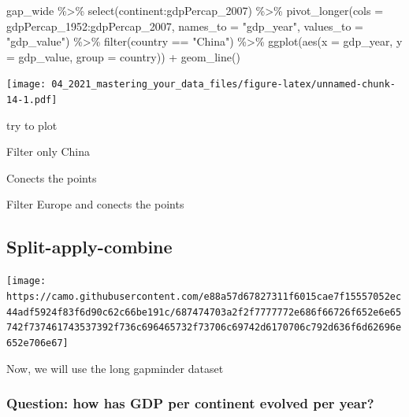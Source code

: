 \documentclass[
]{article}
\newenvironment{Shaded}{\begin{snugshade}}{\end{snugshade}}
\newcommand{\AttributeTok}[1]{\textcolor[rgb]{0.77,0.63,0.00}{#1}}
\newcommand{\FunctionTok}[1]{\textcolor[rgb]{0.00,0.00,0.00}{#1}}
\newcommand{\NormalTok}[1]{#1}
\newcommand{\SpecialCharTok}[1]{\textcolor[rgb]{0.00,0.00,0.00}{#1}}
\newcommand{\StringTok}[1]{\textcolor[rgb]{0.31,0.60,0.02}{#1}}
\begin{document}
\begin{Shaded}
\begin{Highlighting}[]
\NormalTok{gap\_wide }\SpecialCharTok{\%\textgreater{}\%} 
  \FunctionTok{select}\NormalTok{(continent}\SpecialCharTok{:}\NormalTok{gdpPercap\_2007) }\SpecialCharTok{\%\textgreater{}\%} 
  \FunctionTok{pivot\_longer}\NormalTok{(}\AttributeTok{cols =}\NormalTok{ gdpPercap\_1952}\SpecialCharTok{:}\NormalTok{gdpPercap\_2007, }
               \AttributeTok{names\_to =} \StringTok{"gdp\_year"}\NormalTok{, }
               \AttributeTok{values\_to =} \StringTok{"gdp\_value"}\NormalTok{) }\SpecialCharTok{\%\textgreater{}\%} 
  \FunctionTok{filter}\NormalTok{(country }\SpecialCharTok{==} \StringTok{"China"}\NormalTok{) }\SpecialCharTok{\%\textgreater{}\%} 
  \FunctionTok{ggplot}\NormalTok{(}\FunctionTok{aes}\NormalTok{(}\AttributeTok{x =}\NormalTok{ gdp\_year, }
             \AttributeTok{y =}\NormalTok{ gdp\_value, }
             \AttributeTok{group =}\NormalTok{ country)) }\SpecialCharTok{+} 
  \FunctionTok{geom\_line}\NormalTok{()}
\end{Highlighting}
\end{Shaded}

\texttt{[image: 04\_2021\_mastering\_your\_data\_files/figure-latex/unnamed-chunk-14-1.pdf]}

try to plot

Filter only China

Conects the points

Filter Europe and conects the points

\hypertarget{split-apply-combine}{%
\subsection{Split-apply-combine}\label{split-apply-combine}}

\texttt{[image: https://camo.githubusercontent.com/e88a57d67827311f6015cae7f15557052ec44adf5924f83f6d90c62c66be191c/687474703a2f2f7777772e686f66726f652e6e65742f737461743537392f736c696465732f73706c69742d6170706c792d636f6d62696e652e706e67]}

Now, we will use the long gapminder dataset

\hypertarget{question-how-has-gdp-per-continent-evolved-per-year}{%
\subsubsection{Question: how has GDP per continent evolved per
year?}\label{question-how-has-gdp-per-continent-evolved-per-year}}
\end{document}

